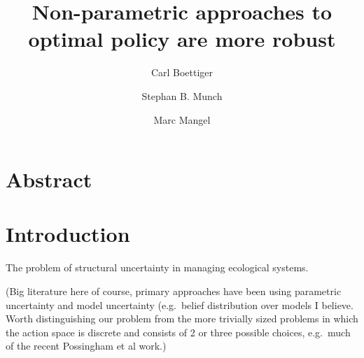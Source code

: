 \documentclass[author-year, review]{elsarticle} %
\begin{document}
\begin{frontmatter}
  \title{Non-parametric approaches to optimal policy are more robust}
  \author[cstar]{Carl Boettiger}
  \author[noaa]{Stephan B. Munch}
  \author[cstar]{Marc Mangel}
  \address[cstar]{Center for Stock Assessment Research, Department of Applied Math and Statistics, University of California, Mail Stop SOE-2, Santa Cruz, CA 95064, USA}
  \address[noaa]{Southwest Fisheries Science Center, National Oceanic and Atmospheric Administration, 110 Shaffer Road, Santa Cruz, CA 95060, USA}
 \end{frontmatter}


\section{Abstract}

\section{Introduction}

The problem of structural uncertainty in managing ecological systems.

(Big literature here of course, primary approaches have been using
parametric uncertainty and model uncertainty (e.g.~belief distribution
over models I believe. Worth distinguishing our problem from the more
trivially sized problems in which the action space is discrete and
consists of 2 or three possible choices, e.g.~much of the recent
Possingham et al work.)
\end{document}
